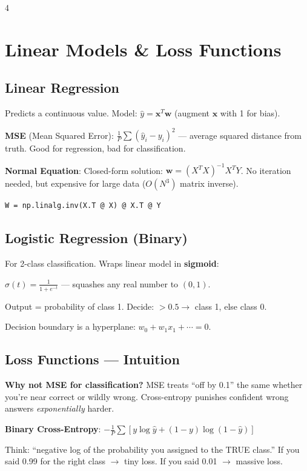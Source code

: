 \documentclass[6pt,landscape,a4paper]{extarticle}
\begin{document}
\begin{multicols}{4}

\section{Linear Models \& Loss Functions}

\subsection{Linear Regression}
Predicts a continuous value. Model: $\hat{y} = \mathbf{x}^T\mathbf{w}$ (augment $\mathbf{x}$ with 1 for bias).

\textbf{MSE} (Mean Squared Error): $\frac{1}{P}\sum(\hat{y}_i - y_i)^2$ --- average squared distance from truth. Good for regression, bad for classification.

\textbf{Normal Equation}: Closed-form solution: $\mathbf{w} = (X^TX)^{-1}X^TY$. No iteration needed, but expensive for large data ($O(N^3)$ matrix inverse).
\begin{lstlisting}
W = np.linalg.inv(X.T @ X) @ X.T @ Y
\end{lstlisting}

\subsection{Logistic Regression (Binary)}
For 2-class classification. Wraps linear model in \textbf{sigmoid}:

$\sigma(t) = \frac{1}{1+e^{-t}}$ --- squashes any real number to $(0,1)$.

Output = probability of class 1. Decide: $>0.5 \to$ class 1, else class 0.

Decision boundary is a hyperplane: $w_0 + w_1x_1 + \cdots = 0$.

\subsection{Loss Functions --- Intuition}
\textbf{Why not MSE for classification?} MSE treats ``off by 0.1'' the same whether you're near correct or wildly wrong. Cross-entropy punishes confident wrong answers \textit{exponentially} harder.

\textbf{Binary Cross-Entropy}: $-\frac{1}{P}\sum[y\log\hat{y} + (1\!-\!y)\log(1\!-\!\hat{y})]$

Think: ``negative log of the probability you assigned to the TRUE class.'' If you said 0.99 for the right class $\to$ tiny loss. If you said 0.01 $\to$ massive loss.


\end{multicols}
\end{document}
